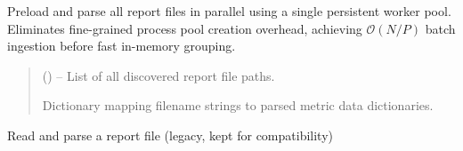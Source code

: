 \documentclass[a4paper,11pt,english,openany,oneside]{sphinxmanual}
\begin{document}
\begin{fulllineitems}

\begin{fulllineitems}
\label{\detokenize{modules/core:core.averager.ReportAverager.preload_all_files}}
\pysigstartsignatures
\pysiglinewithargsret
{}
{}
{}
\pysigstopsignatures
\sphinxAtStartPar
Preload and parse all report files in parallel using a single persistent worker pool.
Eliminates fine-grained process pool creation overhead, achieving $\mathcal{O}(N/P)$ batch ingestion before fast in-memory grouping.
\begin{quote}\begin{description}
\sphinxAtStartPar
{} (\sphinxstyleliteralemphasis{\sphinxupquote{{[}}}\sphinxstyleliteralemphasis{\sphinxupquote{{]}}}) – List of all discovered report file paths.

\sphinxAtStartPar
Dictionary mapping filename strings to parsed metric data dictionaries.

\sphinxAtStartPar
{}

\end{description}\end{quote}

\end{fulllineitems}


\begin{fulllineitems}
\label{\detokenize{modules/core:core.averager.ReportAverager.read_report_file}}
\pysigstartsignatures
\pysiglinewithargsret
{}
{}
{}
\pysigstopsignatures
\sphinxAtStartPar
Read and parse a report file (legacy, kept for compatibility)

\end{fulllineitems}


\end{fulllineitems}
\end{document}
